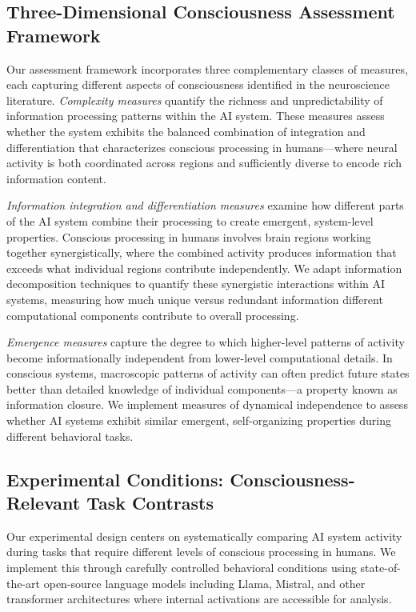 \documentclass[11pt,a4paper]{article}
\begin{document}
\subsection{Three-Dimensional Consciousness Assessment Framework}

Our assessment framework incorporates three complementary classes of measures, each capturing different aspects of consciousness identified in the neuroscience literature. \textit{Complexity measures} quantify the richness and unpredictability of information processing patterns within the AI system. These measures assess whether the system exhibits the balanced combination of integration and differentiation that characterizes conscious processing in humans—where neural activity is both coordinated across regions and sufficiently diverse to encode rich information content.

\textit{Information integration and differentiation measures} examine how different parts of the AI system combine their processing to create emergent, system-level properties. Conscious processing in humans involves brain regions working together synergistically, where the combined activity produces information that exceeds what individual regions contribute independently. We adapt information decomposition techniques to quantify these synergistic interactions within AI systems, measuring how much unique versus redundant information different computational components contribute to overall processing.

\textit{Emergence measures} capture the degree to which higher-level patterns of activity become informationally independent from lower-level computational details. In conscious systems, macroscopic patterns of activity can often predict future states better than detailed knowledge of individual components—a property known as information closure. We implement measures of dynamical independence to assess whether AI systems exhibit similar emergent, self-organizing properties during different behavioral tasks.

\subsection{Experimental Conditions: Consciousness-Relevant Task Contrasts}

Our experimental design centers on systematically comparing AI system activity during tasks that require different levels of conscious processing in humans. We implement this through carefully controlled behavioral conditions using state-of-the-art open-source language models including Llama, Mistral, and other transformer architectures where internal activations are accessible for analysis.
\end{document}
